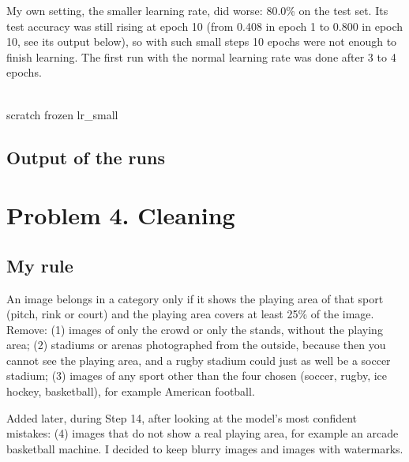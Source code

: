 \documentclass[11pt]{article}
\begin{document}
My own setting, the smaller learning rate, did worse: 80.0\% on the test set.
Its test accuracy was still rising at epoch 10 (from 0.408 in epoch 1 to 0.800
in epoch 10, see its output below), so with such small steps 10 epochs were not
enough to finish learning. The first run with the normal learning rate was done
after 3 to 4 epochs.

\begin{center}
\hfill
{}\hfill
{}\\
\small scratch \hfill frozen \hfill lr\_small
\end{center}

\subsection*{Output of the runs}

\section*{Problem 4. Cleaning}

\subsection*{My rule}
An image belongs in a category only if it shows the playing area of that sport
(pitch, rink or court) and the playing area covers at least 25\% of the image.
Remove: (1) images of only the crowd or only the stands, without the playing
area; (2) stadiums or arenas photographed from the outside, because then you
cannot see the playing area, and a rugby stadium could just as well be a soccer
stadium; (3) images of any sport other than the four chosen (soccer, rugby, ice
hockey, basketball), for example American football.

Added later, during Step 14, after looking at the model's most confident
mistakes: (4) images that do not show a real playing area, for example an arcade
basketball machine. I decided to keep blurry images and images with watermarks.
\end{document}
